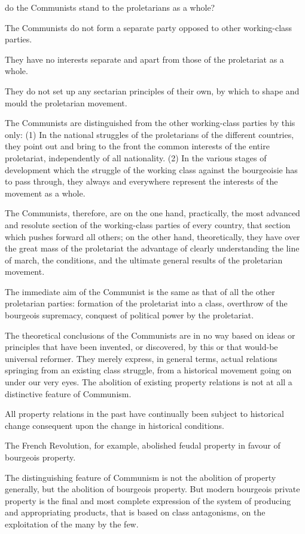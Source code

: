 \label{chap:PandC}
 do the Communists stand to the proletarians as a
whole?

The Communists do not form a separate party opposed to other
working-class parties.

They have no interests separate and apart from those of the proletariat
as a whole.

They do not set up any sectarian principles of their own, by which to
shape and mould the proletarian movement.

The Communists are distinguished from the other working-class parties
by this only: (1) In the national struggles of the proletarians of the
different countries, they point out and bring to the front the common
interests of the entire proletariat, independently of all nationality.
(2) In the various stages of development which the struggle of the
working class against the bourgeoisie has to pass through, they always
and everywhere represent the interests of the movement as a whole.

The Communists, therefore, are on the one hand, practically, the most
advanced and resolute section of the working-class parties of every
country, that section which pushes forward all others; on the other
hand, theoretically, they have over the great mass of the proletariat
the advantage of clearly understanding the line of march, the
conditions, and the ultimate general results of the proletarian
movement.

The immediate aim of the Communist is the same as that of all the other
proletarian parties: formation of the proletariat into a class,
overthrow of the bourgeois supremacy, conquest of political power by
the proletariat.

The theoretical conclusions of the Communists are in no way based on
ideas or principles that have been invented, or discovered, by this or
that would-be universal reformer. They merely express, in general
terms, actual relations springing from an existing class struggle, from
a historical movement going on under our very eyes. The abolition of
existing property relations is not at all a distinctive feature of
Communism.

All property relations in the past have continually been subject to
historical change consequent upon the change in historical conditions.

The French Revolution, for example, abolished feudal property in favour
of bourgeois property.

The distinguishing feature of Communism is not the abolition of
property generally, but the abolition of bourgeois property. But modern
bourgeois private property is the final and most complete expression of
the system of producing and appropriating products, that is based on
class antagonisms, on the exploitation of the many by the few.


